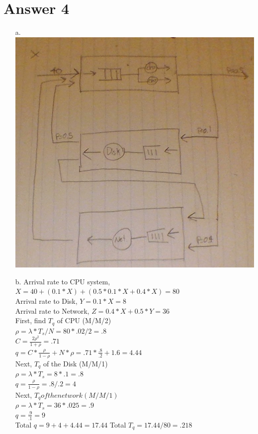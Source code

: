\documentclass[11pt]{article}
\theoremstyle{definition}
\begin{document}
\section*{Answer 4}
\begin{enumerate}
	\item[a.] \includegraphics*[scale=0.5]{q4a.jpg}
	\item[b.] Arrival rate to CPU system, $X = 40 + (0.1*X) + (0.5 * 0.1 * X + 0.4*X) = 80$\\
	Arrival rate to Disk, $Y = 0.1*X = 8$\\
	Arrival rate to Network, $Z = 0.4*X + 0.5*Y = 36$\\
	\newline
	First, find $T_q$ of CPU (M/M/2)\\
	$\rho = \lambda * T_s / N = 80 * .02 / 2 = .8$\\
	$C = \frac{2\rho^2}{1 + \rho} = .71$\\
	$q = C * \frac{\rho}{1 - \rho} + N*\rho = .71 * \frac{.8}{.2} + 1.6 = 4.44$\\
	\newline
	Next, $T_q$ of the Disk (M/M/1)\\
	$\rho = \lambda * T_s = 8 * .1 = .8$\\
	$q = \frac{\rho}{1 - \rho} = .8 / .2 = 4$\\
	\newline
	Next, $T_q of the network (M/M/1)$\\
	$\rho = \lambda * T_s = 36 * .025 = .9$\\
	$q = \frac{.9}{.1} = 9$\\
	\newline
	Total $q = 9 + 4 + 4.44 = 17.44$
	Total $T_q = 17.44 / 80 = .218$
	

\end{enumerate}
\end{document}
